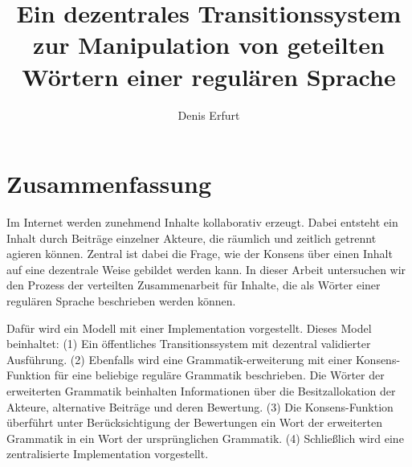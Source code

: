 \documentclass[a4paper,12pt]{report}
\author{Denis Erfurt}
\date{\now}
\title{Ein dezentrales Transitionssystem zur Manipulation von geteilten Wörtern einer regulären Sprache}
\begin{document}

\newpage
\thispagestyle{empty}
\mbox{}

\newpage
\thispagestyle{empty}
\mbox{}






\newpage
{} 
\section*{Zusammenfassung}


% 
% 
% 







Im Internet werden zunehmend Inhalte kollaborativ erzeugt. 
Dabei entsteht ein Inhalt durch Beiträge einzelner Akteure, die räumlich und zeitlich getrennt agieren können.
Zentral ist dabei die Frage, wie der Konsens über einen Inhalt auf eine dezentrale Weise gebildet werden kann.
In dieser Arbeit untersuchen wir den Prozess der verteilten Zusammenarbeit für Inhalte, die als Wörter einer regulären Sprache beschrieben werden können. 

Dafür wird ein Modell mit einer Implementation vorgestellt. Dieses Model beinhaltet: 
(1) Ein öffentliches Transitionssystem mit dezentral validierter Ausführung. 
(2) Ebenfalls wird eine Grammatik-erweiterung mit einer Konsens-Funktion für eine beliebige reguläre Grammatik beschrieben. Die Wörter der erweiterten Grammatik beinhalten Informationen über die Besitzallokation der Akteure, alternative Beiträge und deren Bewertung. 
(3) Die Konsens-Funktion überführt unter Berücksichtigung der Bewertungen ein Wort der erweiterten Grammatik in ein Wort der ursprünglichen Grammatik. (4) Schließlich wird eine zentralisierte Implementation vorgestellt.
\end{document}
